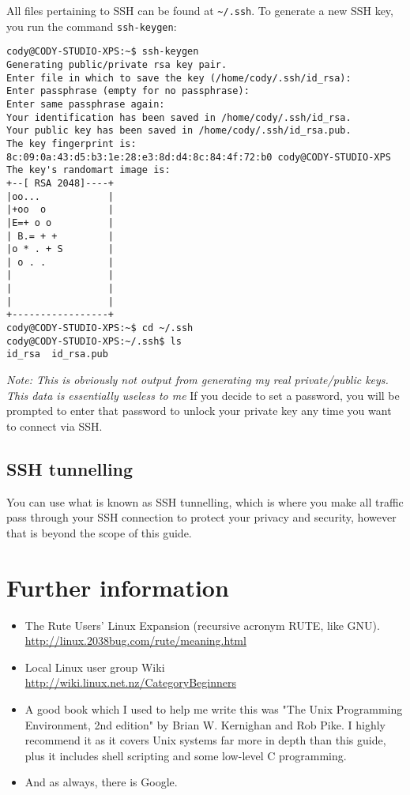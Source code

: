 \documentclass{article}
\begin{document}
All files pertaining to SSH can be found at \texttt{\textasciitilde/.ssh}. To generate a new SSH key, you run the command \texttt{ssh-keygen}:
\begin{verbatim}
cody@CODY-STUDIO-XPS:~$ ssh-keygen
Generating public/private rsa key pair.
Enter file in which to save the key (/home/cody/.ssh/id_rsa): 
Enter passphrase (empty for no passphrase): 
Enter same passphrase again: 
Your identification has been saved in /home/cody/.ssh/id_rsa.
Your public key has been saved in /home/cody/.ssh/id_rsa.pub.
The key fingerprint is:
8c:09:0a:43:d5:b3:1e:28:e3:8d:d4:8c:84:4f:72:b0 cody@CODY-STUDIO-XPS
The key's randomart image is:
+--[ RSA 2048]----+
|oo...            |
|+oo  o           |
|E=+ o o          |
| B.= + +         |
|o * . + S        |
| o . .           |
|                 |
|                 |
|                 |
+-----------------+
cody@CODY-STUDIO-XPS:~$ cd ~/.ssh
cody@CODY-STUDIO-XPS:~/.ssh$ ls
id_rsa  id_rsa.pub
\end{verbatim}
\emph{Note: This is obviously not output from generating my real private/public keys. This data is essentially useless to me}
If you decide to set a password, you will be prompted to enter that password to unlock your private key any time you want to connect via SSH.

\subsection{SSH tunnelling}
You can use what is known as SSH tunnelling, which is where you make all traffic pass through your SSH connection to protect your privacy and security, however that is beyond the scope of this guide. 

\section{Further information}
\begin{itemize}
\item The Rute Users' Linux Expansion (recursive acronym RUTE, like GNU). \\ 
\url{http://linux.2038bug.com/rute/meaning.html}

\item Local Linux user group Wiki \\ \url{http://wiki.linux.net.nz/CategoryBeginners}

\item A good book which I used to help me write this was "The Unix Programming Environment, 2nd edition" by Brian W. Kernighan and Rob Pike. I highly recommend it as it covers Unix systems far more in depth than this guide, plus it includes shell scripting and some low-level C programming. 

\item And as always, there is Google.
\end{itemize} 
\end{document}
